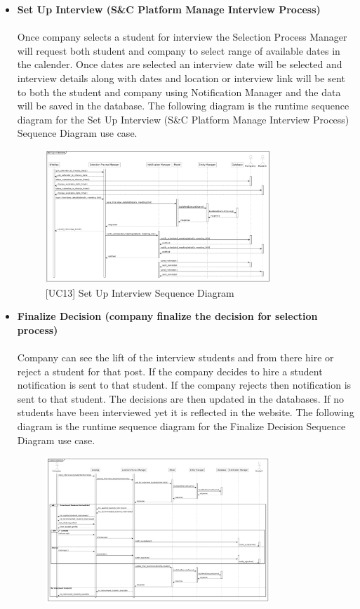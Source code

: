 \begin{itemize}
    \item \textbf{Set Up Interview (S\&C Platform Manage Interview Process)} \\ \\
    Once company selects a student for interview the Selection Process Manager will request both student and company to select range of available dates in the calender. Once dates are selected an interview date will be selected and interview details along with dates and location or interview link will be sent to both the student and company using Notification Manager and the data will be saved in the database. The following diagram is the runtime sequence diagram for the Set Up Interview (S\&C Platform Manage Interview Process) Sequence Diagram use case.
    \begin{figure}[H]
    \centering
    \includegraphics[width=0.8\textwidth]{Images/set_up_interview_sequence1.png}
    \caption{\label{fig:metamodel9}[UC13] Set Up Interview Sequence Diagram}
    \end{figure}
    \item \textbf{Finalize Decision (company finalize the decision for selection process)} \\ \\
    Company can see the lift of the interview students and from there hire or reject a student for that post. If the company decides to hire a student notification is sent to that student. If the company rejects then notification is sent to that student. The decisions are then updated in the databases. If no students have been interviewed yet it is reflected in the website. The following diagram is the runtime sequence diagram for the Finalize Decision Sequence Diagram use case.
    \begin{figure}[H]
    \centering
    \includegraphics[width=0.8\textwidth]{Images/Finalize-decision-sequence-diagram.png}

\end{figure}
\end{itemize}
